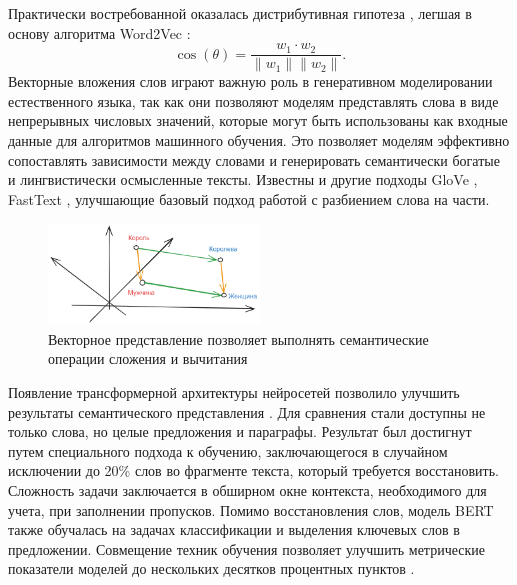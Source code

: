 Практически востребованной оказалась дистрибутивная гипотеза \cite{harris1954distributional}, легшая в основу алгоритма Word2Vec 
\cite{mikolov2013efficient}:
\begin{equation}
    \cos(\theta) = \frac{w_1 \cdot w_2}{\|w_1\| \|w_2\|}.
\end{equation}
Векторные вложения слов играют важную роль в генеративном моделировании естественного языка, так как они позволяют моделям представлять слова в виде непрерывных 
числовых значений, которые могут быть использованы как входные данные для алгоритмов машинного обучения. Это позволяет моделям эффективно сопоставлять зависимости 
между словами и генерировать семантически богатые и лингвистически осмысленные тексты. Известны и другие подходы GloVe \cite{pennington2014glove}, FastText \cite{bojanowski2017enriching},
улучшающие базовый подход работой с разбиением слова на части.
\begin{figure}[h]
    \centering
    \includegraphics[width=0.5\textwidth]{assets/ml/nlp/vector.excalidraw.png}
    \caption{Векторное представление позволяет выполнять семантические операции сложения и вычитания}
    \label{embedding}
\end{figure}
Появление трансформерной архитектуры нейросетей позволило улучшить результаты семантического представления \cite{devlin2018bert}. 
Для сравнения стали доступны не только слова, но целые предложения и параграфы. Результат был достигнут путем специального подхода к обучению,
заключающегося в случайном исключении до 20\% слов во фрагменте текста, который требуется восстановить. Сложность задачи 
заключается в обширном окне контекста, необходимого для учета, при заполнении пропусков. Помимо восстановления слов, модель BERT
также обучалась на задачах классификации и выделения ключевых слов в предложении. Совмещение техник обучения позволяет
улучшить метрические показатели моделей до нескольких десятков процентных пунктов \cite{hospedales2021meta}.








